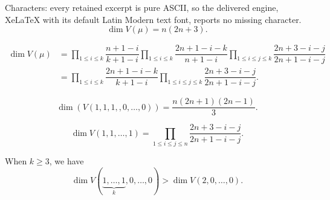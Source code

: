 \documentclass[10pt,a4paper]{amsart}
\begin{document}
Characters: every retained excerpt is pure ASCII, so the delivered engine, XeLaTeX with its default Latin Modern text font, reports no missing character.
		\begin{equation}\label{case 1}
		    \dim V(\mu)=n(2n+3).
		\end{equation}

		\begin{equation}\label{case 2}
		    \begin{aligned}
		    \dim V(\mu)&=\prod_{1\leqslant i\leqslant k}\dfrac{n+1-i}{k+1-i}\prod_{1\leqslant i\leqslant k}\dfrac{2n+1-i-k}{n+1-i}\prod_{1\leqslant i\leqslant j\leqslant k}\dfrac{2n+3-i-j}{2n+1-i-j}\\
            &=\prod_{1\leqslant i\leqslant k}\dfrac{2n+1-i-k}{k+1-i}\prod_{1\leqslant i\leqslant j\leqslant k}\dfrac{2n+3-i-j}{2n+1-i-j}.
		\end{aligned}
		\end{equation}

        \begin{equation}\label{case 2.3}
            \dim(V(1,1,1,,0,\dots,0))=\dfrac{n(2n+1)(2n-1)}{3}.
        \end{equation}

    \begin{equation}\label{case 3}
         \dim V(1,1,\dots,1)=\prod_{1\leqslant i\leqslant j\leqslant n}\dfrac{2n+3-i-j}{2n+1-i-j}.
    \end{equation}

\begin{lem}\label{first type1}
    When $k\geqslant 3$, we have
	\[\dim V(\underbrace{1,\ldots,1}_k,0,\ldots,0)>\dim V(2,0,\ldots,0).\]
    
\end{lem}
\end{document}
